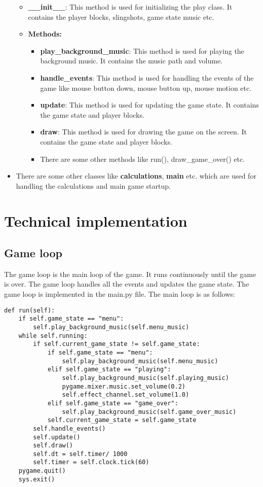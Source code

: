 \documentclass[12pt]{article}
\begin{document}
\begin{itemize}
\begin{itemize}
            \item \textbf{\_\_init\_\_}: This method is used for initializing the play class. It contains the player blocks, slingshots, game state music etc.
            \item \textbf{Methods:}
                \begin{itemize}
                    \item \textbf{play\_background\_music}: This method is used for playing the background music. It contains the music path and volume.
                    \item \textbf{handle\_events}: This method is used for handling the events of the game like mouse button down, mouse button up, mouse motion etc.
                    \item \textbf{update}: This method is used for updating the game state. It contains the game state and player blocks.
                    \item \textbf{draw}: This method is used for drawing the game on the screen. It contains the game state and player blocks.
                    \item There are some other methods like run(), draw\_game\_over() etc.
                \end{itemize}
        \end{itemize}    
    \item There are some other classes like \textbf{calculations}, \textbf{main} etc. which are used for handling the calculations and main game startup.     
\end{itemize}

\section{Technical implementation}
\subsection{Game loop}
The game loop is the main loop of the game. It runs continuously until the game is over. The game loop handles all the events and updates the game state. The game loop is implemented in the main.py file. The main loop is as follows:

\begin{verbatim}
def run(self):
    if self.game_state == "menu":
        self.play_background_music(self.menu_music)
    while self.running:
        if self.current_game_state != self.game_state:
            if self.game_state == "menu":
                self.play_background_music(self.menu_music)
            elif self.game_state == "playing":
                self.play_background_music(self.playing_music)
                pygame.mixer.music.set_volume(0.2)
                self.effect_channel.set_volume(1.0)
            elif self.game_state == "game_over":
                self.play_background_music(self.game_over_music)
            self.current_game_state = self.game_state
        self.handle_events()
        self.update()
        self.draw()
        self.dt = self.timer/ 1000
        self.timer = self.clock.tick(60)
    pygame.quit()
    sys.exit()
\end{verbatim}
\end{document}
